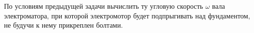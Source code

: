 По условиям предыдущей задачи вычислить ту угловую скорость $\omega$ вала электроматора, при которой электромотор будет подпрыгивать над фундаментом, не будучи к нему прикреплен
болтами.